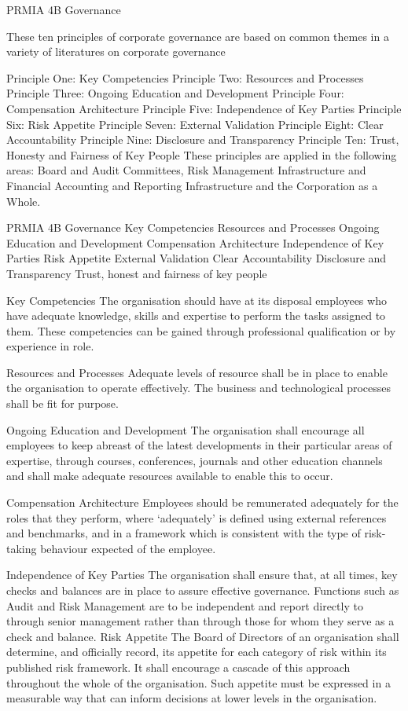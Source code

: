 PRMIA 4B Governance
 
These ten principles of corporate governance are based on common themes in a variety of literatures on corporate governance  
 
Principle One: Key Competencies
Principle Two: Resources and Processes
Principle Three: Ongoing Education and Development
Principle Four: Compensation Architecture
Principle Five: Independence of Key Parties
Principle Six: Risk Appetite
Principle Seven: External Validation
Principle Eight: Clear Accountability
Principle Nine: Disclosure and Transparency
Principle Ten: Trust, Honesty and Fairness of Key People
These principles are applied in the following areas: Board and Audit Committees, Risk Management Infrastructure
and Financial Accounting and Reporting Infrastructure and the Corporation as a Whole.
 

PRMIA 4B Governance
Key Competencies
Resources and Processes
Ongoing Education and Development
Compensation Architecture
Independence of Key Parties
Risk Appetite
External Validation
Clear Accountability
Disclosure and Transparency
Trust, honest and fairness of key people

Key Competencies 
The organisation should have at its disposal employees who have adequate knowledge, skills and expertise to perform the tasks assigned to them. These 
competencies can be gained through professional qualification or by experience in role. 

Resources and Processes 
Adequate levels of resource shall be in place to enable the organisation to operate effectively. The business and technological processes shall be fit for purpose. 

Ongoing Education and Development 
The organisation shall encourage all employees to keep abreast of the latest developments in their particular areas of expertise, through courses, conferences, 
journals and other education channels and shall make adequate resources available to enable this to occur. 

Compensation Architecture 
Employees should be remunerated adequately for the roles that they perform, where ‘adequately’ is defined using external references and benchmarks, and in a 
framework which is consistent with the type of risk-taking behaviour expected of the employee. 

Independence of Key Parties 
The organisation shall ensure that, at all times, key checks and balances are in place to assure effective governance. Functions such as Audit and Risk 
Management are to be independent and report directly to through senior management rather than through those for whom they serve as a check and balance. 
Risk Appetite 
The Board of Directors of an organisation shall determine, and officially record, its appetite for each category of risk within its published risk framework. It shall 
encourage a cascade of this approach throughout the whole of the organisation. Such appetite must be expressed in a measurable way that can inform decisions 
at lower levels in the organisation. 

